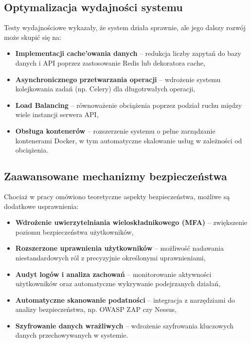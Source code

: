 \subsection{Optymalizacja wydajności systemu}
Testy wydajnościowe wykazały, że system działa sprawnie, ale jego dalszy rozwój może skupić się na:
\begin{itemize}
    \item \textbf{Implementacji cache'owania danych} – redukcja liczby zapytań do bazy danych i API poprzez zastosowanie Redis lub dekoratora cache,
    \item \textbf{Asynchronicznego przetwarzania operacji} – wdrożenie systemu kolejkowania zadań (np. Celery) dla długotrwałych operacji,
    \item \textbf{Load Balancing} – równoważenie obciążenia poprzez podział ruchu między wiele instancji serwera API,
    \item \textbf{Obsługa kontenerów} – rozszerzenie systemu o pełne zarządzanie kontenerami Docker, w tym automatyczne skalowanie usług w zależności od obciążenia.
\end{itemize}

\subsection{Zaawansowane mechanizmy bezpieczeństwa}
Chociaż w pracy omówiono teoretyczne aspekty bezpieczeństwa, możliwe są dodatkowe usprawnienia:
\begin{itemize}
    \item \textbf{Wdrożenie uwierzytelniania wieloskładnikowego (MFA)} – zwiększenie poziomu bezpieczeństwa użytkowników,
    \item \textbf{Rozszerzone uprawnienia użytkowników} – możliwość nadawania niestandardowych ról z precyzyjnie określonymi uprawnieniami,
    \item \textbf{Audyt logów i analiza zachowań} – monitorowanie aktywności użytkowników oraz automatyczne wykrywanie podejrzanych działań,
    \item \textbf{Automatyczne skanowanie podatności} – integracja z narzędziami do analizy bezpieczeństwa, np. OWASP ZAP czy Nessus,
    \item \textbf{Szyfrowanie danych wrażliwych} – wdrożenie szyfrowania kluczowych danych przechowywanych w systemie.
\end{itemize}

